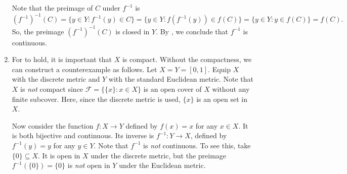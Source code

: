 \begin{enumerate}
\begin{pf}
Note that the preimage of \(C\) under \(f^{-1}\) is
\[
(f^{-1})^{-1}(C)=\{y\in Y:f^{-1}(y)\in C\}
=\{y \in Y: f(f^{-1}(y))\in f(C)\}
=\{y\in Y:y\in f(C)\}
=f(C).
\]
So, the preimage \((f^{-1})^{-1}(C)\) is closed in \(Y\). By
, we conclude that \(f^{-1}\) is continuous.
\end{pf}

\item For  to hold, it is important that \(X\) is
compact. Without the compactness, we can construct a counterexample as follows.
Let \(X=Y=[0,1]\). Equip \(X\) with the discrete metric and \(Y\) with the
standard Euclidean metric. Note that \(X\) is \emph{not} compact since
\(\mathcal{F}=\{\{x\}: x\in X\}\) is an open cover of \(X\) without any finite
subcover. Here, since the discrete metric is used, \(\{x\}\) is an open set in
\(X\).

Now consider the function \(f:X\to Y\) defined by \(f(x)=x\) for any \(x\in
X\). It is both bijective and continuous. Its inverse is \(f^{-1}:Y\to X\),
defined by \(f^{-1}(y)=y\) for any \(y\in Y\). Note that \(f^{-1}\) is
\emph{not} continuous. To see this, take \(\{0\}\subseteq X\). It is open in
\(X\) under the discrete metric, but the preimage \(f^{-1}(\{0\})=\{0\}\) is
\emph{not} open in \(Y\) under the Euclidean metric.
\end{enumerate}

